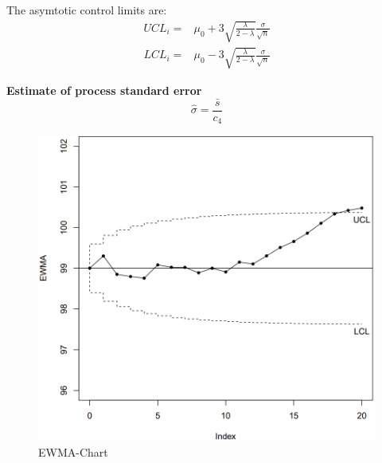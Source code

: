 The asymtotic control limits are:
\begin{equation}
  \begin{split}
    UCL_i =& \mu_0 + 3 \sqrt{\frac{\lambda}{2-\lambda}}\frac{\sigma}{\sqrt{n}}\\
    LCL_i =& \mu_0 - 3 \sqrt{\frac{\lambda}{2-\lambda}}\frac{\sigma}{\sqrt{n}}
  \end{split}
\end{equation}

\textbf{Estimate of process standard error}\\
\begin{equation}
  \hat{\sigma} = \frac{\bar{s}}{c_4}
\end{equation}

\begin{figure}[H]
  \centering
  \includegraphics[width=0.8\linewidth]{Pics/4.2.png}
  \caption{EWMA-Chart}
  \label{EWMA}
\end{figure}
